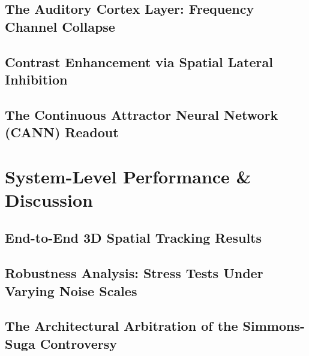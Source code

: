 \documentclass[12pt,a4paper]{report}
\begin{document}
\section{The Auditory Cortex Layer: Frequency Channel Collapse}

\section{Contrast Enhancement via Spatial Lateral Inhibition}

\section{The Continuous Attractor Neural Network (CANN) Readout}

\chapter{System-Level Performance \& Discussion}
\label{ch:performance}

\section{End-to-End 3D Spatial Tracking Results}

\section{Robustness Analysis: Stress Tests Under Varying Noise Scales}

\section{The Architectural Arbitration of the Simmons-Suga Controversy}
\end{document}
